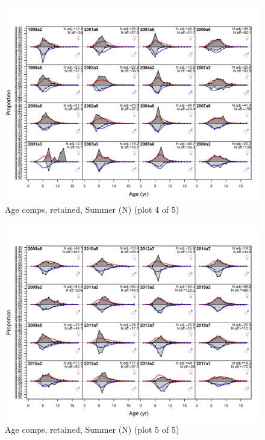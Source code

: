 \documentclass[12pt,]{article}
\begin{document}
\begin{figure}
\centering
\includegraphics{r4ss/plots_mod1/comp_agefit_flt2mkt2_page4.png}
\caption{Age comps, retained, Summer (N) (plot 4 of 5)
\label{fig:age_fits}}
\end{figure}

\begin{figure}
\centering
\includegraphics{r4ss/plots_mod1/comp_agefit_flt2mkt2_page5.png}
\caption{Age comps, retained, Summer (N) (plot 5 of 5)
\label{fig:age_fits}}
\end{figure}
\end{document}
